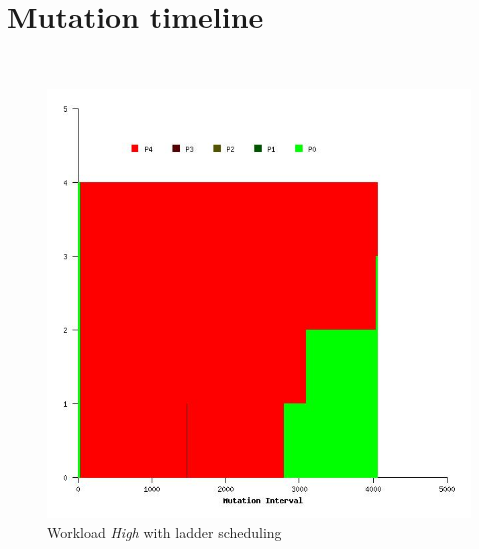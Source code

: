 \chapter{Mutation timeline}~\label{app:mutation_timeline}

\begin{figure}
  \begin{center}
    \includegraphics[scale=0.4]{figures/mutation_timeline_figures/mut_t0/High/125_4.jpeg}%
    \caption{Workload \textit{High} with ladder scheduling}
    \label{fig:wrk_high_ladder}
  \end{center}
\end{figure}

